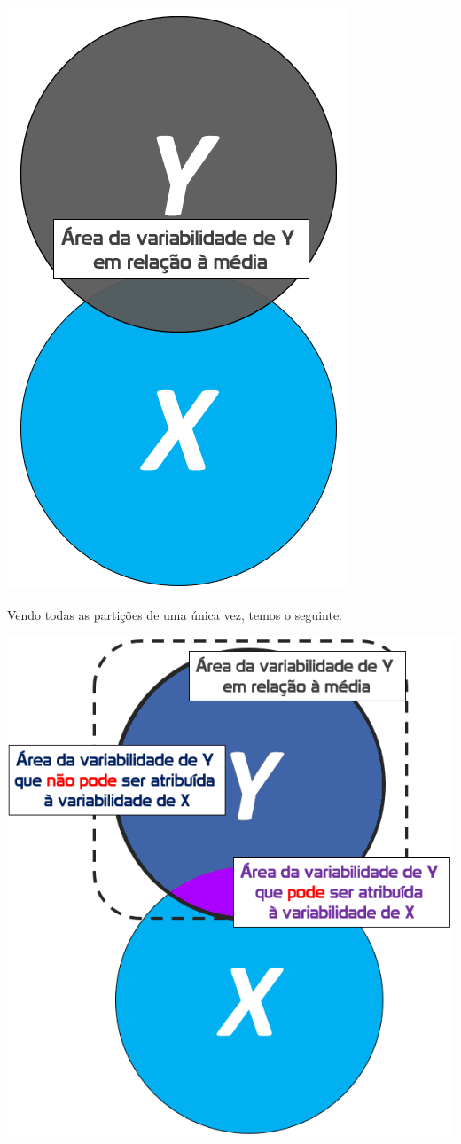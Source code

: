 \documentclass[
]{book}
\begin{document}
\includegraphics{./img/cap_reg_xy_SST.png}

Vendo todas as partições de uma única vez, temos o seguinte:

\includegraphics{./img/cap_reg_x_y_SSE_SSR_SST.png}
\end{document}
